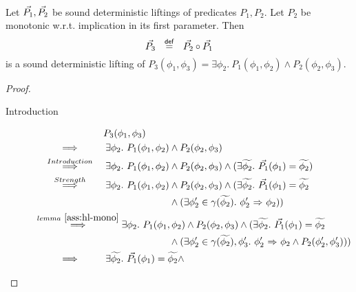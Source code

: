 \begin{lemma}
    \label{lemma:det-lift-comp}~\\
    Let $\vec{P_1}, \vec{P_2}$ be sound deterministic liftings of predicates $P_1, P_2$.
    Let $P_2$ be monotonic w.r.t. implication in its first parameter.
    Then
    \begin{displaymath}
    \vec{P_3} ~~\overset{\textup{\textmd{\textsf{def}}}}{=}~~ \vec{P_2} \circ \vec{P_1}
    \end{displaymath}
    is a sound deterministic lifting of $P_3(\phi_1, \phi_3) = \exists \phi_2.~ P_1(\phi_1, \phi_2) \wedge P_2(\phi_2, \phi_3)$.
\end{lemma}
\begin{proof}~
    \begin{description}
        \item[Introduction]
        \begin{align*}
        & \phantom{\overset{}{~\quad\quad\implies\quad\quad~}}~
        P_3(\phi_1, \phi_3)\\
        & \overset{}{~\quad\quad\implies\quad\quad~} 
        \exists \phi_2.~ P_1(\phi_1, \phi_2) \wedge P_2(\phi_2, \phi_3)\\
        & \overset{Introduction}{~\quad\quad\implies\quad\quad~} 
        \exists \phi_2.~ P_1(\phi_1, \phi_2) \wedge P_2(\phi_2, \phi_3)
        \wedge (\exists \grad{\phi_2}.~ \dgrad{P_1}(\phi_1) = \grad{\phi_2})\\
        & \overset{Strength}{~\quad\quad\implies\quad\quad~} 
        \exists \phi_2.~ P_1(\phi_1, \phi_2) \wedge P_2(\phi_2, \phi_3)
        \wedge (\exists \grad{\phi_2}.~ \dgrad{P_1}(\phi_1) = \grad{\phi_2} \\
        & \quad\quad\quad\quad\quad\quad\quad\quad\quad\quad\quad\quad\quad\quad
        \wedge 
        (\exists \phi_2' \in \gamma(\grad{\phi_2}).~ \phiImplies{\phi_2'}{\phi_2}))\\
        & \overset{lemma~\ref{ass:hl-mono}}{~\quad\quad\implies\quad\quad~} 
        \exists \phi_2.~ P_1(\phi_1, \phi_2) \wedge P_2(\phi_2, \phi_3)
        \wedge (\exists \grad{\phi_2}.~ \dgrad{P_1}(\phi_1) = \grad{\phi_2} \\
        & \quad\quad\quad\quad\quad\quad\quad\quad\quad\quad\quad\quad\quad\quad
        \wedge 
        (\exists \phi_2' \in \gamma(\grad{\phi_2}), \phi_3'.~ \phiImplies{\phi_2'}{\phi_2} \wedge P_2(\phi_2', \phi_3')))\\
        & \overset{}{~\quad\quad\implies\quad\quad~} 
        \exists \grad{\phi_2}.~ \dgrad{P_1}(\phi_1) = \grad{\phi_2} \wedge 

\end{align*}
\end{description}
\end{proof}
